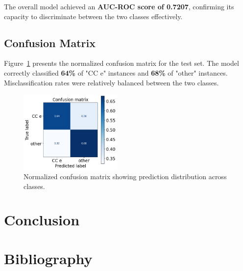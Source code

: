 \documentclass{pracalicmgr}
\begin{document}
The overall model achieved an \textbf{AUC-ROC score of 0.7207}, confirming its capacity to discriminate between the two classes effectively.

\subsection{Confusion Matrix}

Figure~\ref{fig:conf_matrix} presents the normalized confusion matrix for the test set. The model correctly classified \textbf{64\%} of "CC e" instances and \textbf{68\%} of "other" instances. Misclassification rates were relatively balanced between the two classes.

\begin{figure}[H]
    \centering
    \includegraphics[width=0.45\textwidth]{src/tranformerMatrixFinal.png}
    \caption{Normalized confusion matrix showing prediction distribution across classes.}
    \label{fig:conf_matrix}
\end{figure}


\section{Conclusion}

\newpage

\section{Bibliography}


\end{document}
